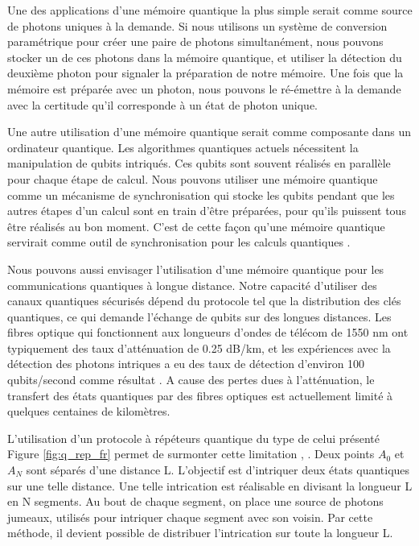 Une des applications d'une m\'emoire quantique la plus simple serait comme source de photons uniques \`a la demande.  Si nous utilisons un syst\`eme de conversion param\'etrique pour cr\'eer une paire de photons simultan\'ement, nous pouvons stocker un de ces photons dans la m\'emoire quantique, et utiliser la d\'etection du deuxi\`eme photon pour signaler la pr\'eparation de notre m\'emoire.  Une fois que la m\'emoire est pr\'epar\'ee avec un photon, nous pouvons le r\'e-\'emettre \`a la demande avec la certitude qu'il corresponde \`a un \'etat de photon unique.

Une autre utilisation d'une m\'emoire quantique serait comme composante dans un ordinateur quantique.  Les algorithmes quantiques actuels n\'ecessitent la manipulation de qubits intriqu\'es.  Ces qubits sont souvent r\'ealis\'es en parall\`ele pour chaque \'etape de calcul. Nous pouvons utiliser une m\'emoire quantique comme un m\'ecanisme de synchronisation qui stocke les qubits pendant que les autres \'etapes d'un calcul sont en train d'\^etre pr\'epar\'ees, pour qu'ils puissent tous \^etre r\'ealis\'es au bon moment.  C'est de cette fa\c{c}on qu'une m\'emoire quantique servirait comme outil de synchronisation pour les calculs quantiques  \cite{lvovsky2009optical}.

Nous pouvons aussi envisager l'utilisation d'une m\'emoire quantique pour les communications quantiques \`a longue distance.  Notre capacit\'e d'utiliser des canaux quantiques s\'ecuris\'es d\'epend du protocole tel que la distribution des cl\'es quantiques, ce qui demande l'\'echange de qubits sur des longues distances.  Les fibres optique qui fonctionnent aux longueurs d'ondes de t\'el\'ecom de 1550 nm ont typiquement des taux d'att\'enuation de 0.25 dB/km, et les exp\'eriences avec la d\'etection des photons intriques a eu des taux de d\'etection d'environ 100 qubits/second comme r\'esultat \cite{Zeilinger07b}.  A cause des pertes dues \`a l'att\'enuation, le transfert des \'etats quantiques par des fibres optiques est actuellement limit\'e \`a quelques centaines de kilom\`etres.



L'utilisation d'un protocole \`a r\'ep\'eteurs quantique du type de celui pr\'esent\'e Figure  \ref{fig:q_rep_fr} permet de surmonter cette limitation \cite{Briegel98}, \cite{Duan01}. Deux points $A_0$ et $A_N$ sont s\'epar\'es d'une distance L. L'objectif est d'intriquer deux \'etats quantiques sur une telle distance.  Une telle intrication est r\'ealisable en divisant la longueur L en N segments.  Au bout de chaque segment, on place une source de photons jumeaux, utilis\'es pour intriquer chaque segment avec son voisin.  Par cette m\'ethode, il devient possible de distribuer l'intrication sur toute la longueur L. 

